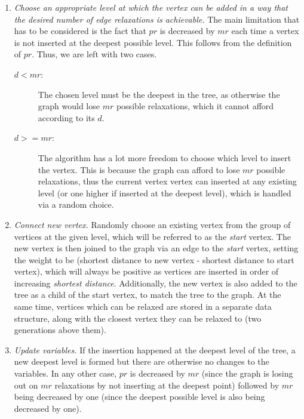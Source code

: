 \documentclass{l4proj}
\begin{document}
\begin{enumerate}[I]
	\item
	\emph{Choose an appropriate level at which the vertex can be added in a way that the desired number of edge relaxations is achievable.} The main limitation that has to be considered is the fact that $pr$ is decreased by $mr$ each time a vertex is not inserted at the deepest possible level. This follows from the definition of $pr$. Thus, we are left with two cases.

	\begin{description}
		\item[$d < mr$:]
		The chosen level must be the deepest in the tree, as otherwise the graph would lose $mr$ possible relaxations, which it cannot afford according to its $d$. 
		\item[$d >= mr$:]
		The algorithm has a lot more freedom to choose which level to insert the vertex. This is because the graph can afford to lose $mr$ possible relaxations, thus the current vertex vertex can inserted at any existing level (or one higher if inserted at the deepest level), which is handled via a random choice.
	\end{description} 

	\item
	\emph{Connect new vertex.} Randomly choose an existing vertex from the group of vertices at the given level, which will be referred to as the \emph{start} vertex. The new vertex is then joined to the graph via an edge to the \emph{start} vertex, setting the weight to be (shortest distance to new vertex - shortest distance to start vertex), which will always be positive as vertices are inserted in order of increasing \emph{shortest distance}.  Additionally, the new vertex is also added to the tree as a child of the start vertex, to match the tree to the graph. At the same time, vertices which can be relaxed are stored in a separate data structure, along with the closest vertex they can be relaxed to (two generations above them).

	\item
	\emph{Update variables.} If the insertion happened at the deepest level of the tree, a new deepest level is formed but there are otherwise no changes to the variables. In any other case, $pr$ is decreased by $mr$ (since the graph is losing out on $mr$ relaxations by not inserting at the deepest point) followed by $mr$ being decreased by one (since the deepest possible level is also being decreased by one). 
\end{enumerate}
\end{document}
